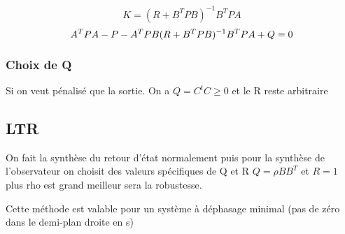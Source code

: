 \documentclass[resume]{subfiles}
\begin{document}
$$
K = (R+B^TPB)^{-1}B^TPA$$
$$A^TPA-P-A^TPB(R+B^TPB)^{-1}B^TPA+Q=0\space\space\space$$

\subsubsection{Choix de Q}
Si on veut pénalisé que la sortie. On a $Q = C^tC \geq 0$  et le R reste arbitraire


\subsection{LTR}
On fait la synthèse du retour d'état normalement puis pour la synthèse de l'observateur on choisit des valeurs spécifiques de Q et R $Q=\rho BB^T$ et $ R=1$ plus rho est grand meilleur sera la robustesse.

Cette méthode est valable pour un système à déphasage minimal (pas de zéro dans le demi-plan droite en s)
\end{document}

